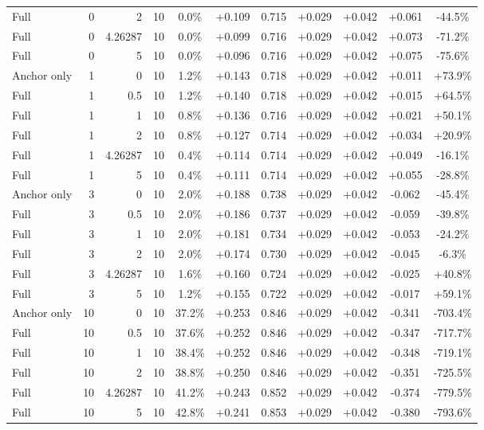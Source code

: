 \begin{table}[htbp]
\begin{tabular}{lrrrccccccc}
Full & 0 & 2 & 10 & 0.0\% & +0.109 & 0.715 & +0.029 & +0.042 & +0.061 & -44.5\% \\
Full & 0 & 4.26287 & 10 & 0.0\% & +0.099 & 0.716 & +0.029 & +0.042 & +0.073 & -71.2\% \\
Full & 0 & 5 & 10 & 0.0\% & +0.096 & 0.716 & +0.029 & +0.042 & +0.075 & -75.6\% \\
Anchor only & 1 & 0 & 10 & 1.2\% & +0.143 & 0.718 & +0.029 & +0.042 & +0.011 & +73.9\% \\
Full & 1 & 0.5 & 10 & 1.2\% & +0.140 & 0.718 & +0.029 & +0.042 & +0.015 & +64.5\% \\
Full & 1 & 1 & 10 & 0.8\% & +0.136 & 0.716 & +0.029 & +0.042 & +0.021 & +50.1\% \\
Full & 1 & 2 & 10 & 0.8\% & +0.127 & 0.714 & +0.029 & +0.042 & +0.034 & +20.9\% \\
Full & 1 & 4.26287 & 10 & 0.4\% & +0.114 & 0.714 & +0.029 & +0.042 & +0.049 & -16.1\% \\
Full & 1 & 5 & 10 & 0.4\% & +0.111 & 0.714 & +0.029 & +0.042 & +0.055 & -28.8\% \\
Anchor only & 3 & 0 & 10 & 2.0\% & +0.188 & 0.738 & +0.029 & +0.042 & -0.062 & -45.4\% \\
Full & 3 & 0.5 & 10 & 2.0\% & +0.186 & 0.737 & +0.029 & +0.042 & -0.059 & -39.8\% \\
Full & 3 & 1 & 10 & 2.0\% & +0.181 & 0.734 & +0.029 & +0.042 & -0.053 & -24.2\% \\
Full & 3 & 2 & 10 & 2.0\% & +0.174 & 0.730 & +0.029 & +0.042 & -0.045 & -6.3\% \\
Full & 3 & 4.26287 & 10 & 1.6\% & +0.160 & 0.724 & +0.029 & +0.042 & -0.025 & +40.8\% \\
Full & 3 & 5 & 10 & 1.2\% & +0.155 & 0.722 & +0.029 & +0.042 & -0.017 & +59.1\% \\
Anchor only & 10 & 0 & 10 & 37.2\% & +0.253 & 0.846 & +0.029 & +0.042 & -0.341 & -703.4\% \\
Full & 10 & 0.5 & 10 & 37.6\% & +0.252 & 0.846 & +0.029 & +0.042 & -0.347 & -717.7\% \\
Full & 10 & 1 & 10 & 38.4\% & +0.252 & 0.846 & +0.029 & +0.042 & -0.348 & -719.1\% \\
Full & 10 & 2 & 10 & 38.8\% & +0.250 & 0.846 & +0.029 & +0.042 & -0.351 & -725.5\% \\
Full & 10 & 4.26287 & 10 & 41.2\% & +0.243 & 0.852 & +0.029 & +0.042 & -0.374 & -779.5\% \\
Full & 10 & 5 & 10 & 42.8\% & +0.241 & 0.853 & +0.029 & +0.042 & -0.380 & -793.6\% \\

\end{tabular}
\end{table}
